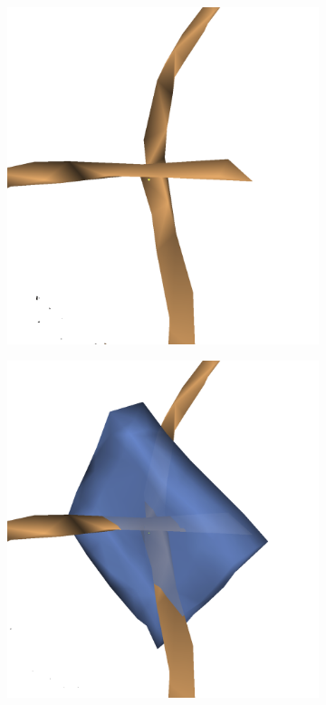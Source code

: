 \begin{figure}[htpb]
	\newcommand{\mywidth}{0.3\textwidth}
	\centering
	\begin{subfigure}[b]{\mywidth}
		\centering
		\includegraphics[width=\textwidth]{data/images/splitting/junction.png}
		\caption{\label{fig:skelSplitA}}
	\end{subfigure}
	\hspace{3mm}
	\begin{subfigure}[b]{\mywidth}
		\centering
		\includegraphics[width=\textwidth]{data/images/splitting/plane.png}

\end{subfigure}
\end{figure}
